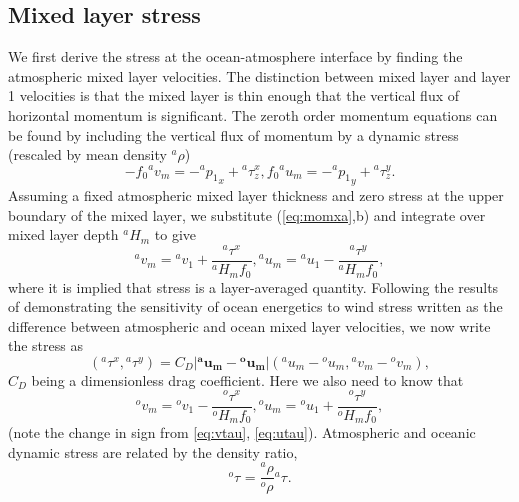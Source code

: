 \documentclass[11pt, a4paper,twoside]{article}
\newcommand{\rhb}[1]{{{}^{#1}\rho}}
\newcommand{\p}[2]{{{}^{#1}p_{#2}}}
\newcommand{\uu}[2]{{{}^{#1}u_{#2}}}
\newcommand{\vv}[2]{{{}^{#1}v_{#2}}}
\newcommand{\HH}[2]{{{}^{#1}H_{#2}}}
\newcommand{\tx}[2]{{}^{#1}\tau^{#2}}
\newcommand{\vc}[1]{\mathbf{#1}}
\numberwithin{equation}{section}
\begin{document}
\subsection{Mixed layer stress}\label{sec:mix1}
We first derive the stress at the ocean-atmosphere interface by finding the atmospheric mixed layer velocities.
The distinction between mixed layer and layer 1 velocities is that the mixed layer is thin enough that the vertical flux of horizontal momentum is significant.
The zeroth order momentum equations can be found by including the vertical flux of momentum by a dynamic stress (rescaled by mean density $\rhb{a}$)
\begin{subequations}
\begin{equation}
- f_0 \vv{a}{m} = -\p{a}{1}_x + \tx{a}{x}_z,
\end{equation}
\begin{equation}
 f_0 \uu{a}{m} = -\p{a}{1}_y + \tx{a}{y}_z.
\end{equation}
\end{subequations}
Assuming a fixed atmospheric mixed layer thickness and zero stress at the upper boundary of the mixed layer, we substitute (\ref{eq:momxa},b) and integrate over mixed layer depth $\HH{a}{m}$ to give
\begin{subequations}
\begin{equation}\label{eq:vtau}
\vv{a}{m} = \vv{a}{1} + \frac{\tx{a}{x}}{\HH{a}{m}f_0},
\end{equation}
\begin{equation}\label{eq:utau}
\uu{a}{m} = \uu{a}{1} - \frac{\tx{a}{y}}{\HH{a}{m}f_0},
\end{equation}
\end{subequations}
where it is implied that stress is a layer-averaged quantity.
Following the results of \citet{duhaut:06} demonstrating the sensitivity of ocean energetics to wind stress written as the difference between atmospheric and ocean mixed layer velocities, we now write the stress as
\begin{equation}\label{eq:stress2}
(\tx{a}{x},\tx{a}{y}) = C_D \lvert \vc{\uu{a}{m}} - \vc{\uu{o}{m}} \rvert (\uu{a}{m} - \uu{o}{m},\vv{a}{m} - \vv{o}{m}),
\end{equation}
$C_D$ being a dimensionless drag coefficient.
Here we also need to know that 
\begin{subequations}
\begin{equation}\label{eq:vtauoc}
\vv{o}{m} = \vv{o}{1} - \frac{\tx{o}{x}}{\HH{o}{m}f_0},
\end{equation}
\begin{equation}\label{eq:utauoc}
\uu{o}{m} = \uu{o}{1} + \frac{\tx{o}{y}}{\HH{o}{m}f_0},
\end{equation}
\end{subequations}
(note the change in sign from \ref{eq:vtau}, \ref{eq:utau}).
Atmospheric and oceanic dynamic stress are related by the density ratio,
\begin{equation}\label{eq:ocstr2}
\tx{o}{} =  \frac{\rhb{a}}{\rhb{o}}\tx{a}{}.
\end{equation}
\end{document}
